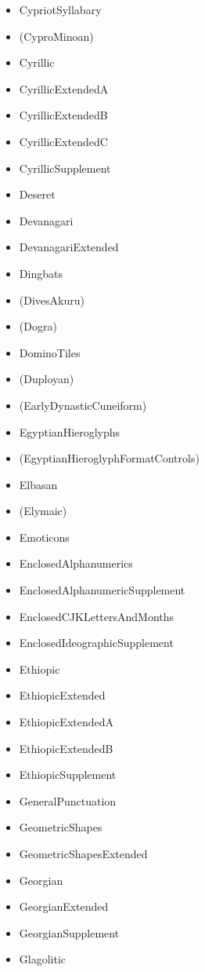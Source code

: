 \documentclass{article}
\newenvironment{itemlist}{%
  \begin{itemize}
  \setlength{\itemsep}{0pt}
  \setlength{\parsep}{0pt}
  \setlength{\topsep}{0pt}
  \setlength{\partopsep}{0pt}
  \setlength{\parskip}{0pt}
  \setlength{\labelsep}{5pt}}%
{
  \end{itemize}}
\begin{document}
\begin{multicols*}{2}
\begin{itemlist}
        \item CypriotSyllabary
        \item (CyproMinoan)
        \item Cyrillic
        \item CyrillicExtendedA
        \item CyrillicExtendedB
        \item CyrillicExtendedC
        \item CyrillicSupplement
        \item Deseret
        \item Devanagari
        \item DevanagariExtended
        \item Dingbats
        \item (DivesAkuru)
        \item (Dogra)
        \item DominoTiles
        \item (Duployan)
        \item (EarlyDynasticCuneiform)
        \item EgyptianHieroglyphs
        \item (EgyptianHieroglyphFormatControls)
        \item Elbasan
        \item (Elymaic)
        \item Emoticons
        \item EnclosedAlphanumerics
        \item EnclosedAlphanumericSupplement
        \item EnclosedCJKLettersAndMonths
        \item EnclosedIdeographicSupplement
        \item Ethiopic
        \item EthiopicExtended
        \item EthiopicExtendedA
        \item EthiopicExtendedB
        \item EthiopicSupplement
        \item GeneralPunctuation
        \item GeometricShapes
        \item GeometricShapesExtended
        \item Georgian
        \item GeorgianExtended
        \item GeorgianSupplement
        \item Glagolitic

\end{itemlist}
\end{multicols*}
\end{document}
